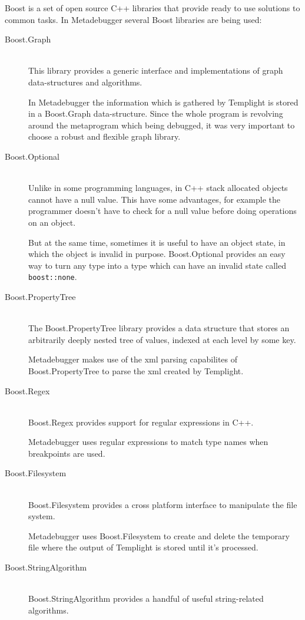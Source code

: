 Boost is a set of open source C++ libraries that provide ready to use solutions
to common tasks. In Metadebugger several Boost libraries are being used:
\begin{description}
    \item[Boost.Graph]\cite{boost-graph} \hfill \\
        This library provides a generic interface and implementations of graph
        data-structures and algorithms.

        In Metadebugger the information which is gathered by Templight is
        stored in a Boost.Graph data-structure. Since the whole program is
        revolving around the metaprogram which being debugged, it was very
        important to choose a robust and flexible graph library.
    \item[Boost.Optional]\cite{boost-optional} \hfill \\
        Unlike in some programming languages, in C++ stack allocated objects
        cannot have a null value. This have some advantages, for example the
        programmer doesn't have to check for a null value before doing
        operations on an object.

        But at the same time, sometimes it is useful to have an object state,
        in which the object is invalid in purpose. Boost.Optional provides an
        easy way to turn any type into a type which can have an invalid state
        called \texttt{boost::none}.
    \item[Boost.PropertyTree]\cite{boost-pt} \hfill \\
        The Boost.PropertyTree library provides a data structure that stores an
        arbitrarily deeply nested tree of values, indexed at each level by some
        key.

        Metadebugger makes use of the xml parsing capabilites of
        Boost.PropertyTree to parse the xml created by Templight.
    \item[Boost.Regex]\cite{boost-regex} \hfill \\
        Boost.Regex provides support for regular expressions in C++.

        Metadebugger uses regular expressions to match type names when
        breakpoints are used.
    \item[Boost.Filesystem]\cite{boost-fs} \hfill \\
        Boost.Filesystem provides a cross platform interface to manipulate the
        file system.

        Metadebugger uses Boost.Filesystem to create and delete the temporary
        file where the output of Templight is stored until it's processed.
    \item[Boost.StringAlgorithm]\cite{boost-string} \hfill \\
        Boost.StringAlgorithm provides a handful of useful string-related
        algorithms.


\end{description}
